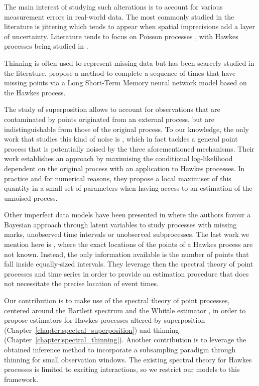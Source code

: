   The main interest of studying such alterations is to account for various measurement errors in real-world data. 
  The most commonly studied in the literature is jittering which tends to appear when spatial imprecisions add a layer of uncertainty. 
  Literature tends to focus on Poisson processes \parencite{Antoniadis2006, Hohage2016, Bonnet2022},
  with Hawkes processes being studied in \textcite{Trouleau2019, Deutsch2020}.

  Thinning is often used to represent missing data but has been scarcely studied in the literature. \textcite{Mei2019} propose a method to complete a sequence of times that have missing points via a Long Short-Term Memory neural network model based on the Hawkes process.
  
  The study of superposition allows to account for observations that are contaminated by points originated from an external process, but are indistinguishable from those of the original process. 
  To our knowledge, the only work that studies this kind of noise is \textcite{Lund2000}, which in fact tackles a general point process that is potentially noised by the three aforementioned mechanisms.
  Their work establishes an approach by maximising the conditional log-likelihood dependent on the original process with an application to Hawkes processes.
  In practice and for numerical reasons, they propose a local maximiser of this quantity in a small set of parameters when having access to an estimation of the unnoised process.

  Other imperfect data models have been presented in \textcite{Linderman2014} where the authors favour a Bayesian approach through latent variables to study processes with missing marks, unobserved time intervals or unobserved subprocesses. 
  The last work we mention here is \textcite{Cheysson2022}, where the exact locations of the points of a Hawkes process are not known. 
  Instead, the only information available is the number of points that fall inside equally-sized intervals.
  They leverage then the spectral theory of point processes and time series in order to provide an estimation procedure that does not necessitate the precise location of event times.
  
  Our contribution is to make use of the spectral theory of point processes, centered around the Bartlett spectrum \parencite{Bartlett1964} and the Whittle estimator \parencite{Whittle1952}, in order to propose estimators for Hawkes processes altered by superposition (Chapter~\ref{chapter:spectral_superposition}) and thinning (Chapter~\ref{chapter:spectral_thinning}).
  Another contribution is to leverage the obtained inference method to incorporate a subsampling paradigm through thinning for small observation windows.
  The existing spectral theory for Hawkes processes is limited to exciting interactions, so we restrict our models to this framework.
  
